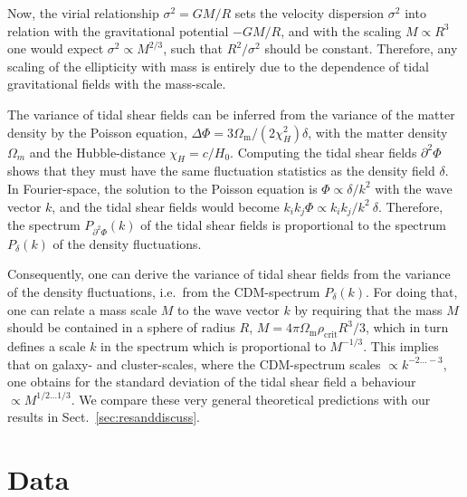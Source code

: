 \documentclass[a4paper,fleqn,usenatbib]{mnras}
\begin{document}
Now, the virial relationship $\sigma^2 = GM/R$ sets the velocity dispersion $\sigma^2$ into relation with the gravitational potential $-GM/R$, and with the scaling $M\propto R^3$ one would expect $\sigma^2\propto M^{2/3}$, such that $R^2/\sigma^2$ should be constant. Therefore, any scaling of the ellipticity with mass is entirely due to the dependence of tidal gravitational fields with the mass-scale.

The variance of tidal shear fields can be inferred from the variance of the matter density by the Poisson equation, $\Delta\Phi = 3\Omega_\mathrm{m}/(2\chi_H^2)\delta$, with the matter density $\Omega_m$ and the Hubble-distance $\chi_H=c/H_0$. Computing the tidal shear fields $\partial^2\Phi$ shows that they must have the same fluctuation statistics as the density field $\delta$. In Fourier-space, the solution to the Poisson equation is $\Phi \propto \delta/k^2$ with the wave vector $k$, and the tidal shear fields would become $k_ik_j\Phi \propto k_ik_j/k^2\:\delta$. Therefore, the spectrum $P_{\partial^2\Phi}(k)$ of the tidal shear fields is proportional to the spectrum $P_\delta(k)$ of the density fluctuations.

Consequently, one can derive the variance of tidal shear fields from the variance of the density fluctuations, i.e.\ from the CDM-spectrum $P_\delta(k)$. For doing that, one can relate a mass scale $M$ to the wave vector $k$ by requiring that the mass $M$ should be contained in a sphere of radius $R$, $M=4\pi\Omega_\mathrm{m}\rho_\mathrm{crit}R^3/3$, which in turn defines a scale $k$ in the spectrum which is proportional to $M^{-1/3}$. This implies that on galaxy- and cluster-scales, where the CDM-spectrum scales $\propto k^{-2\ldots-3}$, one obtains for the standard deviation of the tidal shear field a behaviour $\propto M^{1/2\ldots 1/3}$. We compare these very general theoretical predictions with our results in Sect.~\ref{sec:resanddiscuss}.
\section{Data}
\label{sec:data}
\end{document}
